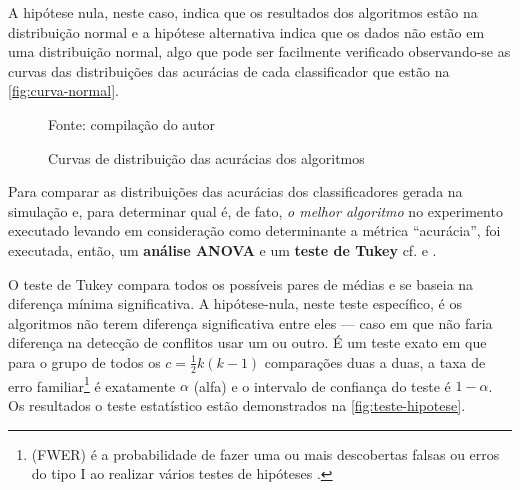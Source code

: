 A hipótese nula, neste caso, indica que os resultados dos algoritmos estão na distribuição normal e a hipótese alternativa indica que os dados não estão em uma distribuição normal, algo que pode ser facilmente verificado observando-se as curvas das distribuições das acurácias de cada classificador que estão na \autoref{fig:curva-normal}.
\begin{figure}[h!]
	\centering
	\caption{Curvas de distribuição das acurácias dos algoritmos}
	
	\label{fig:curva-normal}
	{\scriptsize Fonte: compilação do autor}
\end{figure}

Para comparar as distribuições das acurácias dos classificadores gerada na simulação e, para determinar qual é, de fato, \textit{o melhor algoritmo} no experimento executado levando em consideração como determinante a métrica ``acurácia'', foi executada, então, um \textbf{análise ANOVA} e um \textbf{teste de Tukey} cf.  e . 

O teste de Tukey compara todos os possíveis pares de médias e se baseia na diferença mínima significativa. A hipótese-nula, neste teste específico, é os algoritmos não terem diferença significativa entre eles --- caso em que não faria diferença na detecção de conflitos usar um ou outro. É um teste exato em que para o grupo de todos os $c = \frac{1}{2}k(k-1)$ comparações duas a duas, a taxa de erro familiar\footnote{(FWER) é a probabilidade de fazer uma ou mais descobertas falsas ou erros do tipo I ao realizar vários testes de hipóteses \cite{driscoll_robustness_1996}. } é exatamente $\alpha$ (alfa) e o intervalo de confiança do teste é $1-\alpha$. Os resultados o teste estatístico estão demonstrados na \autoref{fig:teste-hipotese}.

